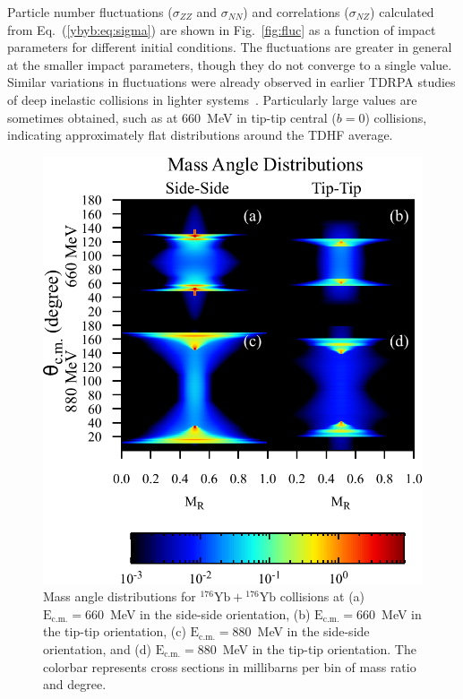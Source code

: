 Particle number fluctuations ($\sigma_{ZZ}$ and $\sigma_{NN}$) and correlations ($\sigma_{NZ}$) calculated from Eq.~(\ref{ybyb:eq:sigma}) are shown in Fig.~\ref{fig:fluc} as a function of  impact parameters for different initial conditions.
The fluctuations are greater in general at the smaller impact parameters, though they do not converge to a single value.
Similar variations in fluctuations were already observed in earlier TDRPA studies of deep inelastic collisions in lighter systems~\citep{simenel2011,williams2018}. 
Particularly large values are sometimes obtained, such as at 660~MeV in tip-tip central ($b=0$) collisions, indicating approximately flat distributions around the TDHF average.

\begin{figure}
	\includegraphics*[width=\textwidth]{../Figures/YbYb/MAD.pdf}
	\caption{Mass angle distributions for $^{176}\mathrm{Yb}+{}^{176}\mathrm{Yb}$ collisions at (a) $\mathrm{E_{c.m.}}=660$~MeV in the side-side orientation, (b) $\mathrm{E_{c.m.}}=660$~MeV in the tip-tip orientation, (c) $\mathrm{E_{c.m.}}=880$~MeV in the side-side orientation, and (d) $\mathrm{E_{c.m.}}=880$~MeV in the tip-tip orientation. The colorbar represents cross sections in millibarns per bin of mass ratio and degree.}
	\label{fig:mad}
\end{figure}

